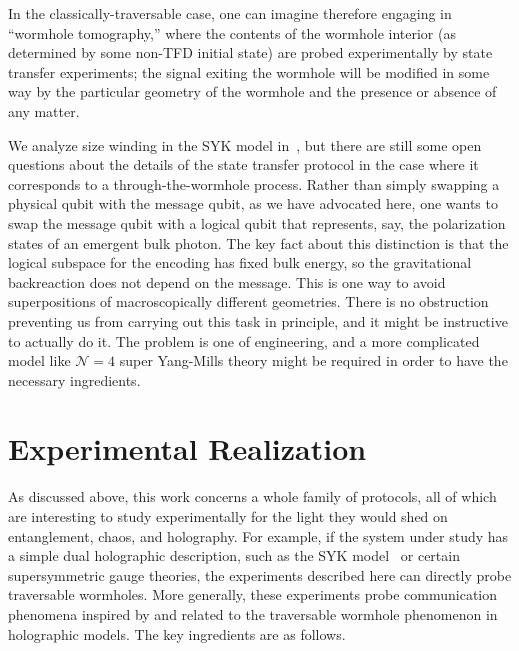 \documentclass[aps,pra,reprint,floatfix,superscriptaddress, nofootinbib,longbibliography,onecolumn,notitlepage,12pt, tightenlines]{revtex4-1}
\begin{document}
In the classically-traversable case, one can imagine therefore engaging in ``wormhole tomography,'' where the contents of the wormhole interior (as determined by some non-TFD initial state) are probed experimentally by state transfer experiments; the signal exiting the wormhole will be modified in some way by the particular geometry of the wormhole and the presence or absence of any matter.

We analyze size winding in the SYK model in~\cite{longpaper}, but there are still some open questions about the details of the state transfer protocol in the case where it corresponds to a through-the-wormhole process. Rather than simply swapping a physical qubit with the message qubit, as we have advocated here, one wants to swap the message qubit with a logical qubit that represents, say, the polarization states of an emergent bulk photon. The key fact about this distinction is that the logical subspace for the encoding has fixed bulk energy, so the gravitational backreaction does not depend on the message. This is one way to avoid superpositions of macroscopically different geometries. There is no obstruction preventing us from carrying out this task in principle, and it might be instructive to actually do it. The problem is one of engineering, and a more complicated model like $\mathcal{N}=4$ super Yang-Mills theory might be required in order to have the necessary ingredients.



\section{Experimental Realization}\label{sec:experiment}

As discussed above, this work concerns a whole family of protocols, all of which are interesting to study experimentally for the light they would shed on entanglement, chaos, and holography. For example, if the system under study has a simple dual holographic description, such as the SYK model~\cite{Sachdev1993Gapless,Georges2000Mean,Georges2001Quantum,kitaev,Polchinski_2016,ms,kamenev,Garc_a_Garc_a_2016} or certain supersymmetric gauge theories, the experiments described here can directly probe traversable wormholes. More generally, these experiments probe communication phenomena inspired by and related to the traversable wormhole phenomenon in holographic models. The key ingredients are as follows. 
\end{document}
